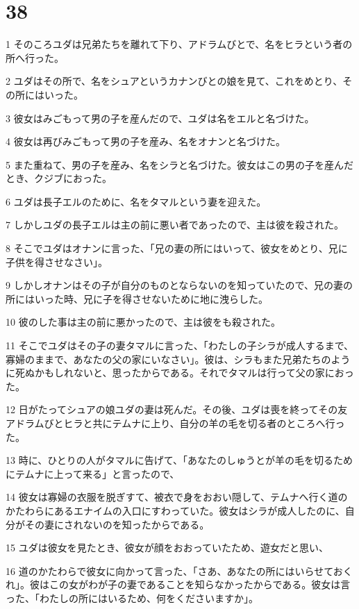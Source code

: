 \chapter{38}

\par 1 そのころユダは兄弟たちを離れて下り、アドラムびとで、名をヒラという者の所へ行った。
\par 2 ユダはその所で、名をシュアというカナンびとの娘を見て、これをめとり、その所にはいった。
\par 3 彼女はみごもって男の子を産んだので、ユダは名をエルと名づけた。
\par 4 彼女は再びみごもって男の子を産み、名をオナンと名づけた。
\par 5 また重ねて、男の子を産み、名をシラと名づけた。彼女はこの男の子を産んだとき、クジブにおった。
\par 6 ユダは長子エルのために、名をタマルという妻を迎えた。
\par 7 しかしユダの長子エルは主の前に悪い者であったので、主は彼を殺された。
\par 8 そこでユダはオナンに言った、「兄の妻の所にはいって、彼女をめとり、兄に子供を得させなさい」。
\par 9 しかしオナンはその子が自分のものとならないのを知っていたので、兄の妻の所にはいった時、兄に子を得させないために地に洩らした。
\par 10 彼のした事は主の前に悪かったので、主は彼をも殺された。
\par 11 そこでユダはその子の妻タマルに言った、「わたしの子シラが成人するまで、寡婦のままで、あなたの父の家にいなさい」。彼は、シラもまた兄弟たちのように死ぬかもしれないと、思ったからである。それでタマルは行って父の家におった。
\par 12 日がたってシュアの娘ユダの妻は死んだ。その後、ユダは喪を終ってその友アドラムびとヒラと共にテムナに上り、自分の羊の毛を切る者のところへ行った。
\par 13 時に、ひとりの人がタマルに告げて、「あなたのしゅうとが羊の毛を切るためにテムナに上って来る」と言ったので、
\par 14 彼女は寡婦の衣服を脱ぎすて、被衣で身をおおい隠して、テムナへ行く道のかたわらにあるエナイムの入口にすわっていた。彼女はシラが成人したのに、自分がその妻にされないのを知ったからである。
\par 15 ユダは彼女を見たとき、彼女が顔をおおっていたため、遊女だと思い、
\par 16 道のかたわらで彼女に向かって言った、「さあ、あなたの所にはいらせておくれ」。彼はこの女がわが子の妻であることを知らなかったからである。彼女は言った、「わたしの所にはいるため、何をくださいますか」。
